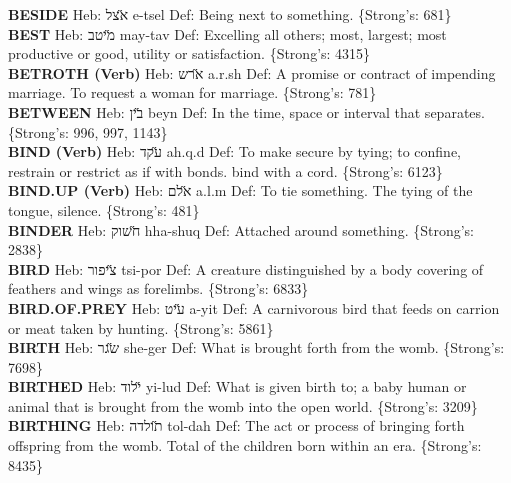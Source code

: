 {\textbf{BESIDE} Heb: {\large\H אצל} e-tsel Def: Being next to something. \{Strong's: 681\}\hfill{}\\

\textbf{BEST} Heb: {\large\H מיטב} may-tav Def: Excelling all others; most, largest; most productive or good, utility or satisfaction. \{Strong's: 4315\}\hfill{}\\

\textbf{BETROTH (Verb)} Heb: {\large\H ארש} a.r.sh Def: A promise or contract of impending marriage. To request a woman for marriage. \{Strong's: 781\}\hfill{}\\

\textbf{BETWEEN} Heb: {\large\H בין} beyn Def: In the time, space or interval that separates. \{Strong's: 996, 997, 1143\}\hfill{}\\

\textbf{BIND (Verb)} Heb: {\large\H עקד} ah.q.d Def: To make secure by tying; to confine, restrain or restrict as if with bonds. bind with a cord. \{Strong's: 6123\}\hfill{}\\

\textbf{BIND.UP (Verb)} Heb: {\large\H אלם} a.l.m Def: To tie something. The tying of the tongue, silence. \{Strong's: 481\}\hfill{}\\

\textbf{BINDER} Heb: {\large\H חשוק} hha-shuq Def: Attached around something. \{Strong's: 2838\}\hfill{}\\

\textbf{BIRD} Heb: {\large\H ציפור} tsi-por Def: A creature distinguished by a body covering of feathers and wings as forelimbs. \{Strong's: 6833\}\hfill{}\\

\textbf{BIRD.OF.PREY} Heb: {\large\H עיט} a-yit Def: A carnivorous bird that feeds on carrion or meat taken by hunting. \{Strong's: 5861\}\hfill{}\\

\textbf{BIRTH} Heb: {\large\H שגר} she-ger Def: What is brought forth from the womb. \{Strong's: 7698\}\hfill{}\\

\textbf{BIRTHED} Heb: {\large\H ילוד} yi-lud Def: What is given birth to; a baby human or animal that is brought from the womb into the open world. \{Strong's: 3209\}\hfill{}\\

\textbf{BIRTHING} Heb: {\large\H תולדה} tol-dah Def: The act or process of bringing forth offspring from the womb. Total of the children born within an era. \{Strong's: 8435\}\hfill{}\\

}
